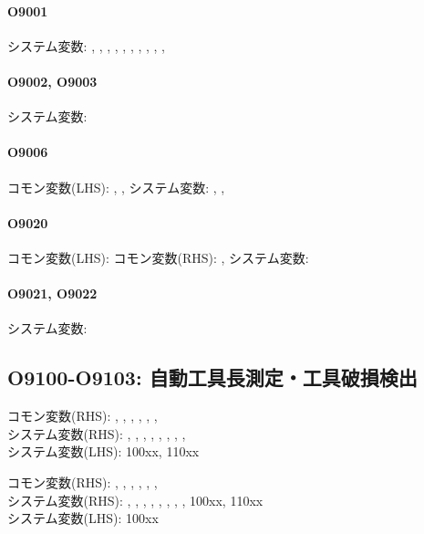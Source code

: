 \paragraph*{O9001}
システム変数:
, , , , , , , , , , 

\paragraph*{O9002, O9003}
システム変数: 

\paragraph*{O9006}
コモン変数(LHS): , ,  \quad
システム変数: , , 

\paragraph*{O9020}
コモン変数(LHS):  \quad
コモン変数(RHS): ,  \quad
システム変数: 

\paragraph*{O9021, O9022}
システム変数: 

\subsection{O9100-O9103: 自動工具長測定・工具破損検出}
\begin{hosoku}\small
コモン変数(RHS): , , , , , , \\
システム変数(RHS): , , , , , , , , \\
システム変数(LHS): \ttNum100xx, \ttNum110xx
\end{hosoku}

\begin{hosoku}\small
コモン変数(RHS): , , , , , , \\
システム変数(RHS): , , , , , , , , \ttNum100xx, \ttNum110xx\\
システム変数(LHS): \ttNum100xx
\end{hosoku}

